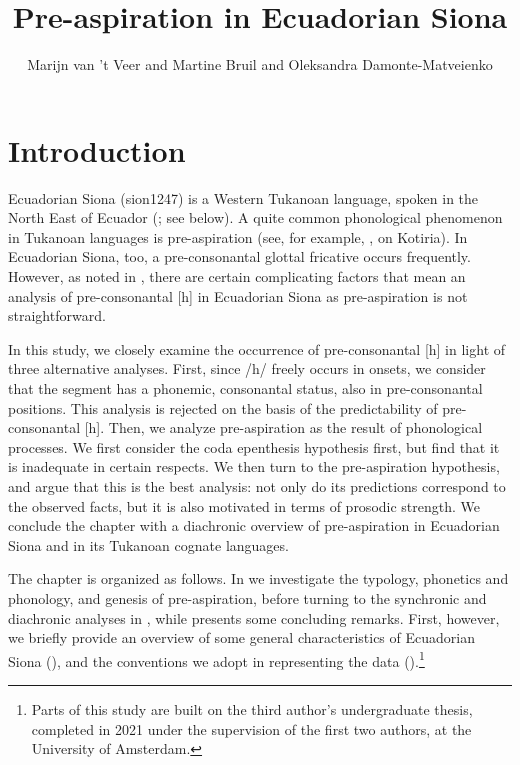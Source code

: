 \documentclass[output=paper]{langscibook}
\author{Marijn van 't Veer\orcid{0000-0003-3415-7199}\affiliation{Leiden University; University of Amsterdam} and         Martine Bruil\orcid{}\affiliation{Leiden University} and        Oleksandra Damonte-Matveienko\orcid{}\affiliation{Leiden University}}
\title{Pre-aspiration in Ecuadorian Siona}
\begin{document}
\maketitle


\section{Introduction}\label{sec-intro}
Ecuadorian Siona (sion1247) is a Western Tukanoan language, spoken in the North East of Ecuador (\cite{Bruil:2014}; see  below). A quite common phonological phenomenon in Tukanoan languages is pre-aspiration (see, for example, \citealt{Stenzel:2007}, on Kotiria). In Ecuadorian Siona, too, a pre-consonantal glottal fricative occurs frequently. However, as noted in \citet{Bruil:2014}, there are certain complicating factors that mean an analysis of pre-consonantal [h] in Ecuadorian Siona as pre-aspiration is not straightforward.

In this study, we closely examine the occurrence of pre-consonantal [h] in light of three alternative analyses. First, since \mbox{/h/} freely occurs in onsets, we consider that the segment has a phonemic, consonantal status, also in pre-consonantal positions. This analysis is rejected on the basis of the predictability of pre-con\-so\-nan\-tal [h]. Then, we analyze pre-aspiration as the result of phonological processes. We first consider the coda epenthesis hypothesis first, but find that it is inadequate in certain respects. We then turn to the pre-aspiration hypothesis, and argue that this is the best analysis: not only do its predictions correspond to the observed facts, but it is also motivated in terms of prosodic strength. We conclude the chapter with a diachronic overview of pre-aspiration in Ecuadorian Siona and in its Tukanoan cognate languages.

The chapter is organized as follows. In  we investigate the typology, phonetics and phonology, and genesis of pre-aspiration, before turning to the synchronic and diachronic analyses in , while  presents some concluding remarks. First, however, we briefly provide an overview of some general characteristics of Ecuadorian Siona (), and the conventions we adopt in representing the data ().\footnote{Parts of this study are built on the third author's undergraduate thesis, completed in 2021 under the supervision of the first two authors, at the University of Amsterdam.}
\end{document}
